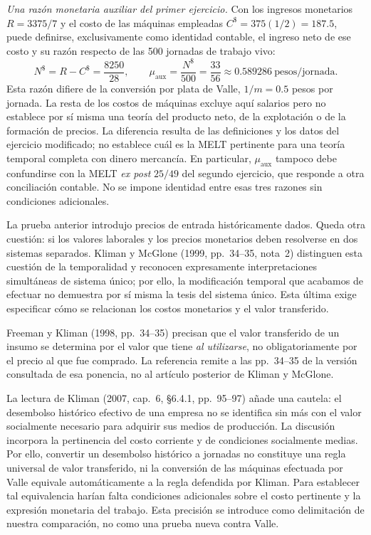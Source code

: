 \documentclass[10pt,twoside]{article}
\begin{document}
\noindent\textit{Una razón monetaria auxiliar del primer ejercicio.} Con los ingresos monetarios $R=3375/7$ y el costo de las máquinas empleadas $C^{\$}=375(1/2)=187.5$, puede definirse, exclusivamente como identidad contable, el ingreso neto de ese costo y su razón respecto de las 500 jornadas de trabajo vivo:
\begin{equation}
N^{\$}=R-C^{\$}=\frac{8250}{28},\qquad
\mu_{\mathrm{aux}}=\frac{N^{\$}}{500}=\frac{33}{56}\approx0.589286\ \text{pesos/jornada}.
\label{eq:mu_aux_iv}
\end{equation}
Esta razón difiere de la conversión por plata de Valle, $1/m=0.5$ pesos por jornada. La resta de los costos de máquinas excluye aquí salarios pero no establece por sí misma una teoría del producto neto, de la explotación o de la formación de precios. La diferencia resulta de las definiciones y los datos del ejercicio modificado; no establece cuál es la MELT pertinente para una teoría temporal completa con dinero mercancía. En particular, $\mu_{\mathrm{aux}}$ tampoco debe confundirse con la MELT \emph{ex post} $25/49$ del segundo ejercicio, que responde a otra conciliación contable. No se impone identidad entre esas tres razones sin condiciones adicionales.

La prueba anterior introdujo precios de entrada históricamente dados. Queda otra cuestión: si los valores laborales y los precios monetarios deben resolverse en dos sistemas separados. Kliman y McGlone (1999, pp.~34--35, nota~2) distinguen esta cuestión de la temporalidad y reconocen expresamente interpretaciones simultáneas de sistema único; por ello, la modificación temporal que acabamos de efectuar no demuestra por sí misma la tesis del sistema único. Esta última exige especificar cómo se relacionan los costos monetarios y el valor transferido.

Freeman y Kliman (1998, pp.~34--35) precisan que el valor transferido de un insumo se determina por el valor que tiene \emph{al utilizarse}, no obligatoriamente por el precio al que fue comprado. La referencia remite a las pp.~34--35 de la versión consultada de esa ponencia, no al artículo posterior de Kliman y McGlone.

La lectura de Kliman (2007, cap.~6, \S 6.4.1, pp.~95--97) añade una cautela: el desembolso histórico efectivo de una empresa no se identifica sin más con el valor socialmente necesario para adquirir sus medios de producción. La discusión incorpora la pertinencia del costo corriente y de condiciones socialmente medias. Por ello, convertir un desembolso histórico a jornadas no constituye una regla universal de valor transferido, ni la conversión de las máquinas efectuada por Valle equivale automáticamente a la regla defendida por Kliman. Para establecer tal equivalencia harían falta condiciones adicionales sobre el costo pertinente y la expresión monetaria del trabajo. Esta precisión se introduce como delimitación de nuestra comparación, no como una prueba nueva contra Valle.
\end{document}
